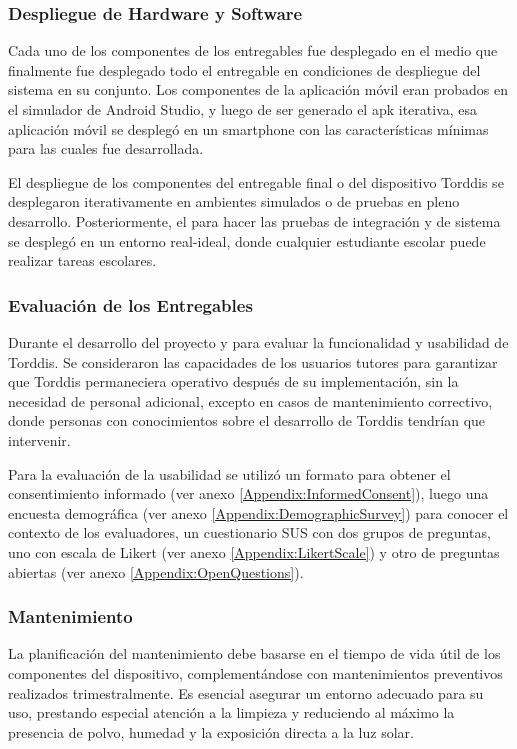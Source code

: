 \documentclass[a4paper,fleqn]{cas-sc}
\begin{document}
			\subsubsection{Despliegue de Hardware y Software}
				Cada uno de los componentes de los entregables fue  desplegado en el medio que finalmente fue desplegado todo el entregable en condiciones de despliegue del sistema en su conjunto. Los componentes de la aplicación móvil eran probados en el simulador de Android Studio, y luego de ser generado el apk iterativa, esa aplicación móvil se desplegó en un smartphone con las características mínimas para las cuales fue desarrollada.
			
				El despliegue de los componentes del entregable final o del dispositivo Torddis se desplegaron iterativamente en ambientes simulados o de pruebas en pleno desarrollo. Posteriormente, el para hacer las pruebas de integración y de sistema se desplegó en un entorno real-ideal, donde cualquier estudiante escolar puede realizar tareas escolares.
			
			\subsubsection{Evaluación de los Entregables}
				Durante el desarrollo del proyecto y para evaluar la funcionalidad y usabilidad de Torddis. Se consideraron las capacidades de los usuarios tutores para garantizar que Torddis permaneciera operativo después de su implementación, sin la necesidad de personal adicional, excepto en casos de mantenimiento correctivo, donde personas con conocimientos sobre el desarrollo de Torddis tendrían que intervenir.
				
				Para la evaluación de la usabilidad se utilizó un formato para obtener el consentimiento informado (ver anexo \ref{Appendix:InformedConsent}), luego una encuesta demográfica (ver anexo \ref{Appendix:DemographicSurvey}) para conocer el contexto de los evaluadores, un cuestionario SUS con dos grupos de preguntas, uno con escala de Likert (ver anexo \ref{Appendix:LikertScale}) y otro de preguntas abiertas (ver anexo \ref{Appendix:OpenQuestions}).
		
			\subsubsection{Mantenimiento}		
				La planificación del mantenimiento debe basarse en el tiempo de vida útil de los componentes del dispositivo, complementándose con mantenimientos preventivos realizados trimestralmente. Es esencial asegurar un entorno adecuado para su uso, prestando especial atención a la limpieza y reduciendo al máximo la presencia de polvo, humedad y la exposición directa a la luz solar.
				
\end{document}
